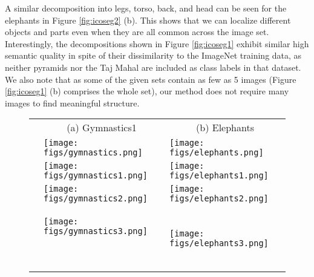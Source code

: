 \documentclass[runningheads]{llncs}
\begin{document}
	A similar decomposition into legs, torso, back, and head can be seen for the elephants in Figure \ref{fig:icoseg2} (b). This shows that we can localize different objects and parts even when they are all common across the image set. Interestingly, the decompositions shown in Figure \ref{fig:icoseg1} exhibit similar high semantic quality in spite of their dissimilarity to the ImageNet training data, as neither pyramids nor the Taj Mahal are included as class labels in that dataset.
	We also note that as some of the given sets contain as few as 5 images (Figure \ref{fig:icoseg1} (b) comprises the whole set), our method does not require many images to find meaningful structure.
	
	
	\begin{figure}[t]
		\setlength{\tabcolsep}{0.8pt}
		\begin{tabular}{lcc}
						& (a) Gymnastics1 & (b) Elephants \\
			& \multicolumn{1}{l|}{\begin{minipage}{0.48\textwidth}\texttt{[image: figs/gymnastics.png]}\end{minipage} }& \multicolumn{1}{l}{\begin{minipage}{0.48\textwidth}\texttt{[image: figs/elephants.png]}\end{minipage}} \\
			
			\rotatebox[origin=c]{90}{\footnotesize$k\!=\!1$}& \multicolumn{1}{l|}{\begin{minipage}{0.48\textwidth}\texttt{[image: figs/gymnastics1.png]}\end{minipage} } & \multicolumn{1}{l}{\begin{minipage}{0.48\textwidth}\texttt{[image: figs/elephants1.png]}\end{minipage}}  \\
			
			\rotatebox[origin=c]{90}{\footnotesize$k\!=\!2$}& \multicolumn{1}{l|}{\begin{minipage}{0.48\textwidth}\texttt{[image: figs/gymnastics2.png]}\end{minipage} } & \multicolumn{1}{l}{\begin{minipage}{0.48\textwidth}\texttt{[image: figs/elephants2.png]}\end{minipage} } \\
			
			\rotatebox[origin=c]{90}{\footnotesize$k\!=\!3$}& \multicolumn{1}{l|}{\begin{minipage}{0.48\textwidth}\texttt{[image: figs/gymnastics3.png]}\end{minipage}~~}  & \multicolumn{1}{l}{\begin{minipage}{0.48\textwidth}\texttt{[image: figs/elephants3.png]}\end{minipage} } \\
			

\end{tabular}
\end{figure}
\end{document}
